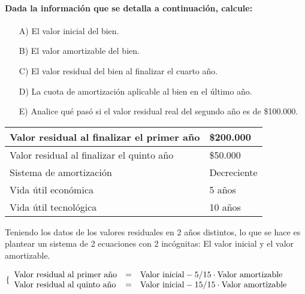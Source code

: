 \documentclass[12pt,a4paper]{article}
\newcommand{\consigna}[1]{\paragraph{\indent #1} \hspace{0pt}}
\begin{document}
        \consigna{Dada la información que se detalla a continuación, calcule:}
        
        \begin{itemize}
			\item[A)]	El valor inicial del bien.
            \item[B)]	El valor amortizable del bien.
            \item[C)]	El valor residual del bien al finalizar el cuarto año.
            \item[D)]	La cuota de amortización aplicable al bien en el último año.
            \item[E)]	Analice qué pasó si el valor residual real del segundo año es de \$100.000.
		\end{itemize}
        
        \begin{table}[H]
        \centering
        	\begin{tabular}{ | l | l | }
            	\hline
                Valor residual al finalizar el primer año	&	\$200.000	\\ \hline
                Valor residual al finalizar el quinto año	&	\$50.000	\\ \hline
                Sistema de amortización						&	Decreciente	\\ \hline
                Vida útil económica							&	5 años		\\ \hline
                Vida útil tecnológica						&	10 años		\\ \hline
			\end{tabular}
		\end{table}
        
        \par{\hspace{0.5cm}
        	Teniendo los datos de los valores residuales en 2 años distintos, lo que se hace es plantear un sistema de 2 ecuaciones con 2 incógnitas: El valor inicial y el valor amortizable.
            }
		
        \begin{center}
        $
        \lbrace
		\begin{array}{ l c l }
            \text{Valor residual al primer año} &=& \text{Valor inicial} - \text{5/15} \cdot \text{Valor amortizable} \\
            \text{Valor residual al quinto año} &=& \text{Valor inicial} - \text{15/15} \cdot \text{Valor amortizable}
		\end{array}
        $
        \end{center}
        
\end{document}
